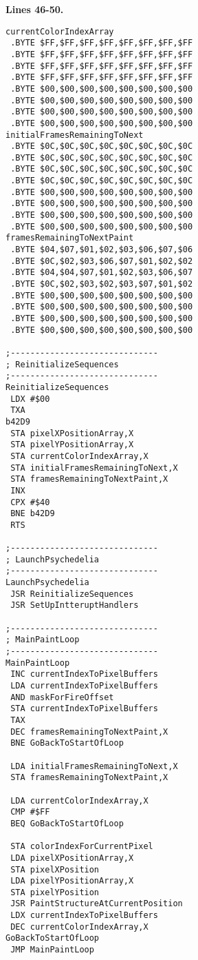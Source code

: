 \clearpage
\textbf{Lines 46-50. }

\clearpage
\begin{minipage}[b]{0.33\linewidth}
\begin{lrbox}{\mybox}%
\begin{lstlisting}[basicstyle=\ttfamily\tiny]
currentColorIndexArray   
 .BYTE $FF,$FF,$FF,$FF,$FF,$FF,$FF,$FF
 .BYTE $FF,$FF,$FF,$FF,$FF,$FF,$FF,$FF
 .BYTE $FF,$FF,$FF,$FF,$FF,$FF,$FF,$FF
 .BYTE $FF,$FF,$FF,$FF,$FF,$FF,$FF,$FF
 .BYTE $00,$00,$00,$00,$00,$00,$00,$00
 .BYTE $00,$00,$00,$00,$00,$00,$00,$00
 .BYTE $00,$00,$00,$00,$00,$00,$00,$00
 .BYTE $00,$00,$00,$00,$00,$00,$00,$00
initialFramesRemainingToNext   
 .BYTE $0C,$0C,$0C,$0C,$0C,$0C,$0C,$0C
 .BYTE $0C,$0C,$0C,$0C,$0C,$0C,$0C,$0C
 .BYTE $0C,$0C,$0C,$0C,$0C,$0C,$0C,$0C
 .BYTE $0C,$0C,$0C,$0C,$0C,$0C,$0C,$0C
 .BYTE $00,$00,$00,$00,$00,$00,$00,$00
 .BYTE $00,$00,$00,$00,$00,$00,$00,$00
 .BYTE $00,$00,$00,$00,$00,$00,$00,$00
 .BYTE $00,$00,$00,$00,$00,$00,$00,$00
framesRemainingToNextPaint   
 .BYTE $04,$07,$01,$02,$03,$06,$07,$06
 .BYTE $0C,$02,$03,$06,$07,$01,$02,$02
 .BYTE $04,$04,$07,$01,$02,$03,$06,$07
 .BYTE $0C,$02,$03,$02,$03,$07,$01,$02
 .BYTE $00,$00,$00,$00,$00,$00,$00,$00
 .BYTE $00,$00,$00,$00,$00,$00,$00,$00
 .BYTE $00,$00,$00,$00,$00,$00,$00,$00
 .BYTE $00,$00,$00,$00,$00,$00,$00,$00

;------------------------------
; ReinitializeSequences
;------------------------------
ReinitializeSequences   
 LDX #$00
 TXA 
b42D9   
 STA pixelXPositionArray,X
 STA pixelYPositionArray,X
 STA currentColorIndexArray,X
 STA initialFramesRemainingToNext,X
 STA framesRemainingToNextPaint,X
 INX 
 CPX #$40
 BNE b42D9
 RTS 

;------------------------------
; LaunchPsychedelia
;------------------------------
LaunchPsychedelia   
 JSR ReinitializeSequences
 JSR SetUpIntteruptHandlers

;------------------------------
; MainPaintLoop
;------------------------------
MainPaintLoop   
 INC currentIndexToPixelBuffers
 LDA currentIndexToPixelBuffers
 AND maskForFireOffset
 STA currentIndexToPixelBuffers
 TAX 
 DEC framesRemainingToNextPaint,X
 BNE GoBackToStartOfLoop

 LDA initialFramesRemainingToNext,X
 STA framesRemainingToNextPaint,X

 LDA currentColorIndexArray,X
 CMP #$FF
 BEQ GoBackToStartOfLoop

 STA colorIndexForCurrentPixel
 LDA pixelXPositionArray,X
 STA pixelXPosition
 LDA pixelYPositionArray,X
 STA pixelYPosition
 JSR PaintStructureAtCurrentPosition
 LDX currentIndexToPixelBuffers
 DEC currentColorIndexArray,X
GoBackToStartOfLoop   
 JMP MainPaintLoop


\end{lstlisting}
\end{lrbox}
\end{minipage}
